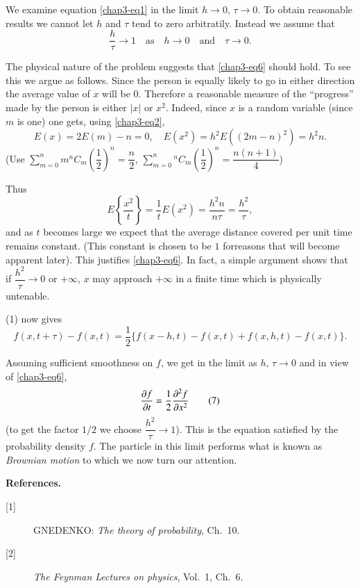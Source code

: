We examine equation \eqref{chap3-eq1} in the limit $h\to 0$, $\tau\to
0$. To obtain reasonable results we cannot let $h$ and $\tau$ tend to
zero arbitratily. Instead we assume that
\begin{equation*}
\frac{h}{\tau}\to 1\quad\text{as}\quad h\to 0\quad\text{and}\quad
\tau\to 0.\tag{6}\label{chap3-eq6}
\end{equation*}

The physical nature of the problem suggests that \eqref{chap3-eq6}
should hold. To see this we argue as follows. Since the person is
equally likely to go in either direction the average value of $x$ will
be $0$. Therefore a reasonable measure of the ``progress'' made by the
person is either $|x|$ or $x^{2}$. Indeed, since $x$ is a random
variable (since $m$ is one) one gets, using \eqref{chap3-eq2},
$$
E(x)=2E(m)-n=0,\quad E(x^{2})=h^{2}E((2m-n)^{2})=h^{2}n.
$$
(Use
$\sum\limits^{n}_{m=0}m{}^{n}C_{m}\left(\dfrac{1}{2}\right)^{n}=\dfrac{n}{2}$,
$\sum\limits^{n}_{m=0}{}^{n}C_{m}\left(\dfrac{1}{2}\right)^{n}=\dfrac{n(n+1)}{4}$)

\medskip

Thus
$$
E\left\{\frac{x^{2}}{t}\right\}=\frac{1}{t}E(x^{2})=\frac{h^{2}n}{n\tau}=\frac{h^{2}}{\tau},
$$
and as $t$ becomes large we expect that the average distance covered
per unit time remains constant. (This constant is chosen to be $1$
for\pageoriginale reasons that will become apparent later). This
justifies \eqref{chap3-eq6}. In fact, a simple argument shows that if
$\dfrac{h^{2}}{\tau}\to 0$ or $+\infty$, $x$ may approach $+\infty$ in
a finite time which is physically untenable.

(1) now gives
$$
f(x,t+\tau)-f(x,t)=\frac{1}{2}\{f(x-h,t)-f(x,t)+f(x,h,t)-f(x,t)\}.
$$

Assuming sufficient smoothness on $f$, we get in the limit as $h$,
$\tau\to 0$ and in view of \eqref{chap3-eq6},
\begin{equation*}
\frac{\partial f}{\partial t}=\frac{1}{2}\frac{\partial^{2}f}{\partial x^{2}}\tag{7}\label{chap3-eq7}
\end{equation*}
(to get the factor $1/2$ we choose $\dfrac{h^{2}}{\tau}\to 1$). This
is the equation satisfied by the probability density $f$. The particle
in this limit performs what is known as {\em Brownian motion} to which
we now turn our attention.

\vskip 1cm

\noindent
{\Large\bf References.}
\begin{description}
\item[\mbox{[1]}] GNEDENKO: {\em The theory of probability},
  Ch.~10.

\item[\mbox{[2]}] {\em The Feynman Lectures on physics}, Vol.~1, Ch.~6.
\end{description}
